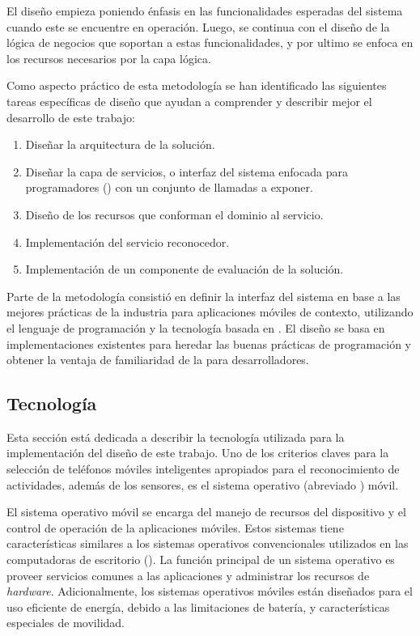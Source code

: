 El diseño empieza poniendo énfasis en las funcionalidades esperadas
del sistema cuando este se encuentre en operación. Luego, se continua
con el diseño de la lógica de negocios que soportan a estas funcionalidades,
y por ultimo se enfoca en los recursos necesarios por la capa lógica.

Como aspecto práctico de esta metodología se han identificado las
siguientes tareas específicas de diseño que ayudan a comprender y
describir mejor el desarrollo de este trabajo:
\begin{enumerate}
\item Diseñar la arquitectura de la solución.
\item Diseñar la capa de servicios, o interfaz del sistema enfocada para
programadores () con un conjunto de llamadas a exponer.
\item Diseño de los recursos que conforman el dominio al servicio.
\item Implementación del servicio reconocedor.
\item Implementación de un componente de evaluación de la solución.
\end{enumerate}
Parte de la metodología consistió en definir la interfaz del sistema
en base a las mejores prácticas de la industria para aplicaciones
móviles de contexto, utilizando el lenguaje de programación 
y la tecnología basada en . El diseño se basa en implementaciones
existentes \cite{Google2016m} para heredar las buenas prácticas de
programación y obtener la ventaja de familiaridad de la 
para desarrolladores.

\subsection{Tecnología}

\label{ssec52:tecnologia}Esta sección está dedicada a describir la
tecnología utilizada para la implementación del diseño de este trabajo.
Uno de los criterios claves para la selección de teléfonos móviles
inteligentes apropiados para el reconocimiento de actividades, además
de los sensores, es el sistema operativo (abreviado ) móvil. 

El sistema operativo móvil se encarga del manejo de recursos del dispositivo
y el control de operación de la aplicaciones móviles. Estos sistemas
tiene características similares a los sistemas operativos convencionales
utilizados en las computadoras de escritorio (). La función
principal de un sistema operativo es proveer servicios comunes a las
aplicaciones y administrar los recursos de \emph{hardware}. Adicionalmente,
los sistemas operativos móviles están diseñados para el uso eficiente
de energía, debido a las limitaciones de batería, y características
especiales de movilidad. 

